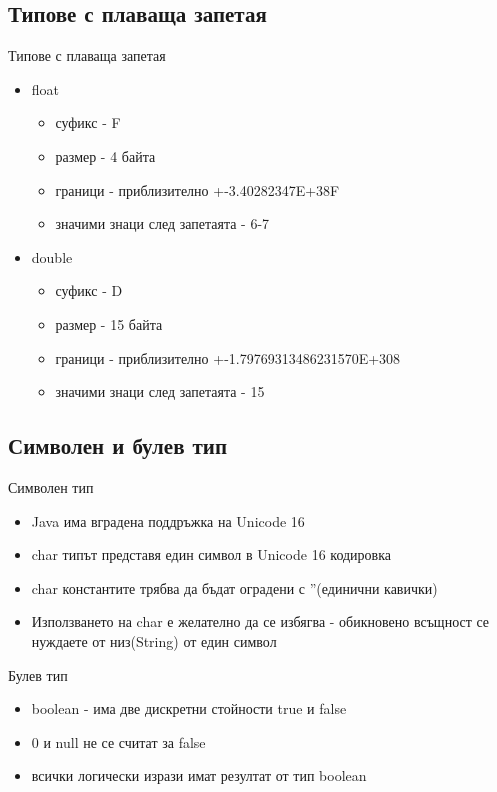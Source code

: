 \documentclass{beamer}
\begin{document}
\subsection{Типове с плаваща запетая}
\begin{frame}{Типове с плаваща запетая}
  \transdissolve
  \begin{itemize}
  \item float
    \begin{itemize}
    \item суфикс - F
    \item размер - 4 байта
    \item граници - приблизително +-3.40282347E+38F
    \item значими знаци след запетаята - 6-7
    \end{itemize} \pause
    \item double
      \begin{itemize}
      \item суфикс - D
      \item размер - 15 байта
      \item граници - приблизително +-1.79769313486231570E+308
      \item значими знаци след запетаята - 15
      \end{itemize}
  \end{itemize}
\end{frame}

\subsection{Символен и булев тип}
\begin{frame}{Символен тип}
  \transdissolve
  \begin{itemize}
  \item Java има вградена поддръжка на Unicode 16 \pause
  \item char типът представя един символ в Unicode 16 кодировка \pause
  \item char константите трябва да бъдат оградени с ''(единични
    кавички) \pause
  \item Използването на char е желателно да се избягва - обикновено
    всъщност се нуждаете от низ(String) от един символ \pause
  \end{itemize}
\end{frame}

\begin{frame}{Булев тип}
  \transdissolve
  \begin{itemize}
  \item boolean - има две дискретни стойности true и false \pause
  \item 0 и null не се считат за false \pause
  \item всички логически изрази имат резултат от тип boolean \pause
  \end{itemize}
\end{frame}
\end{document}
